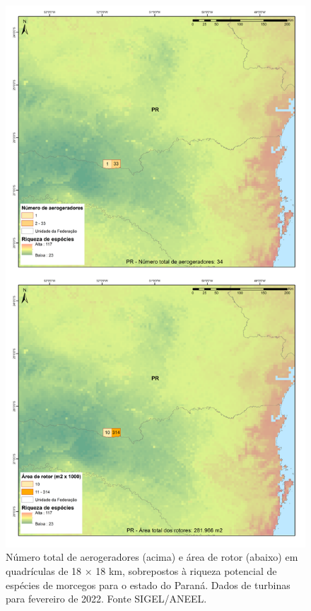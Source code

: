 \documentclass[
  oneside]{scrbook}
\begin{document}
\begin{figure}[H]

{\centering \includegraphics[width=0.75\linewidth]{imagens/cap09/Figura_9.15} 

}

\caption{Número total de aerogeradores (acima) e área de rotor (abaixo) em quadrículas de 18 × 18 km, sobrepostos à riqueza potencial de espécies de morcegos para o estado do Paraná. Dados de turbinas para fevereiro de 2022. Fonte SIGEL/ANEEL.}\label{fig:80}
\end{figure}
\end{document}
